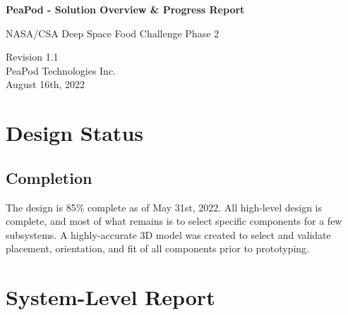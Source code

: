 \documentclass{../tex/report}
\begin{document}
\begin{titlepage}
    \begin{center}
        \vspace*{1.2cm}

        \textbf{\large{PeaPod - Solution Overview \& Progress Report}}

        \vspace{0.5cm}

        NASA/CSA Deep Space Food Challenge Phase 2

        \vfill
        
        \vspace{1.25cm}

        Revision 1.1\\
        PeaPod Technologies Inc.\\
        August 16th, 2022

    \end{center}
\end{titlepage}

\thispagestyle{plain}

\tableofcontents
\clearpage

\section{Design Status}

\subsection{Completion}

The design is 85\% complete as of May 31st, 2022. All high-level design is complete, and most of what remains is to select specific components for a few subsystems. A highly-accurate 3D model was created to select and validate placement, orientation, and fit of all components prior to prototyping.



\clearpage

\section{System-Level Report}



\clearpage
\end{document}
